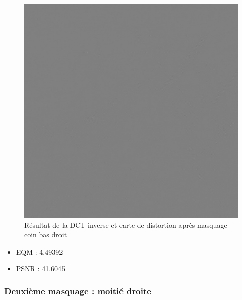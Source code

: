 \documentclass[12pt]{report}
\begin{document}
\begin{figure}[H]
\begin{center}
\includegraphics[scale=0.4]{../ImageRes/idct_masked0_disto.jpg} 
\caption{Résultat de la DCT inverse et carte de distortion après masquage coin bas droit}
\end{center}
\end{figure}

\begin{itemize}
\item EQM : 4.49392
\item PSNR : 41.6045
\end{itemize}

\subsubsection{Deuxième masquage : moitié droite}
\end{document}
